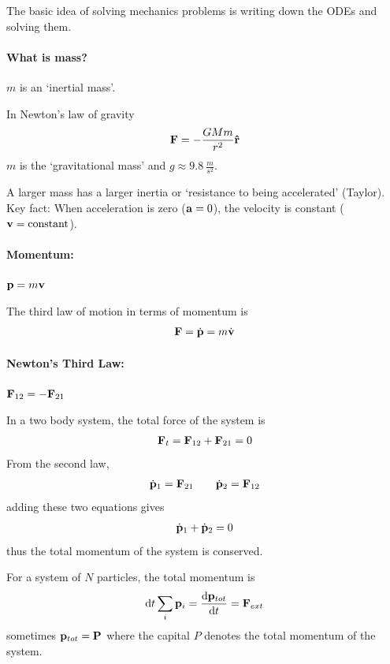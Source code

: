 \documentclass[../main.tex]{subfiles}
\begin{document}
The basic idea of solving mechanics problems is writing down the ODEs and solving them.

\paragraph{What is mass?} $m$ is an `inertial mass'.

In Newton's law of gravity
\begin{align*}
    \vb{F} = -\frac{GMm}{r^2} \vu{r}
\end{align*}
$m$ is the `gravitational mass' and $g \approx \qty{9.8}{\frac{m}{s^2}}$.

A larger mass has a larger inertia or `resistance to being accelerated' (Taylor). Key fact:
When acceleration is zero ($\vb{a} = 0$), the velocity is constant  ($\vb{v} = \text{constant}$).

\paragraph{Momentum:} $\vb{p} = m\vb{v}$

The third law of motion in terms of momentum is
\begin{align*}
    \vb{F} = \dot{\vb{p}} = m\dot{\vb{v}}
\end{align*}

\paragraph{Newton's Third Law:} $\vb{F}_{12} = -\vb{F}_{21}$

In a two body system, the total force of the system is
\begin{align*}
    \vb{F}_t = \vb{F}_{12} + \vb{F}_{21} = 0
\end{align*}
From the second law,
\begin{align*}
    \dot{\vb{p}}_1 = \vb{F}_{21} \qquad \dot{\vb{p}}_2 = \vb{F}_{12}
\end{align*}
adding these two equations gives
\begin{align*}
    \dot{\vb{p}}_1 + \dot{\vb{p}}_2 = 0
\end{align*}
thus the total momentum of the system is conserved.

For a system of $N$ particles, the total momentum is
\begin{align*}
    \dd{t} \sum_i \vb{p}_i = \dv{\vb{p}_{tot}}{t} = \vb{F}_{ext}
\end{align*}
sometimes $\vb{p}_{tot} = \vb{P}$ where the capital $P$ denotes the total momentum of the system.
\end{document}
